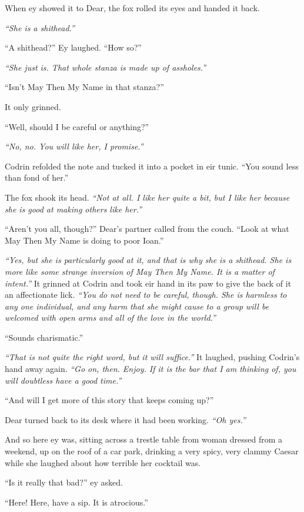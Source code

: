 When ey showed it to Dear, the fox rolled its eyes and handed it back.

\emph{``She is a shithead.''}

``A shithead?'' Ey laughed. ``How so?''

\emph{``She just is. That whole stanza is made up of assholes.''}

``Isn't May Then My Name in that stanza?''

It only grinned.

``Well, should I be careful or anything?''

\emph{``No, no. You will like her, I promise.''}

Codrin refolded the note and tucked it into a pocket in eir tunic. ``You sound less than fond of her.''

The fox shook its head. \emph{``Not at all. I like her quite a bit, but I like her because she is good at making others like her.''}

``Aren't you all, though?'' Dear's partner called from the couch. ``Look at what May Then My Name is doing to poor Ioan.''

\emph{``Yes, but she is particularly good at it, and that is why she is a shithead. She is more like some strange inversion of May Then My Name. It is a matter of intent.''} It grinned at Codrin and took eir hand in its paw to give the back of it an affectionate lick. \emph{``You do not need to be careful, though. She is harmless to any one individual, and any harm that she might cause to a group will be welcomed with open arms and all of the love in the world.''}

``Sounds charismatic.''

\emph{``That is not quite the right word, but it will suffice.''} It laughed, pushing Codrin's hand away again. \emph{``Go on, then. Enjoy. If it is the bar that I am thinking of, you will doubtless have a good time.''}

``And will I get more of this story that keeps coming up?''

Dear turned back to its desk where it had been working. \emph{``Oh yes.''}

And so here ey was, sitting across a trestle table from woman dressed from a weekend, up on the roof of a car park, drinking a very spicy, very clammy Caesar while she laughed about how terrible her cocktail was.

``Is it really that bad?'' ey asked.

``Here! Here, have a sip. It is atrocious.''

